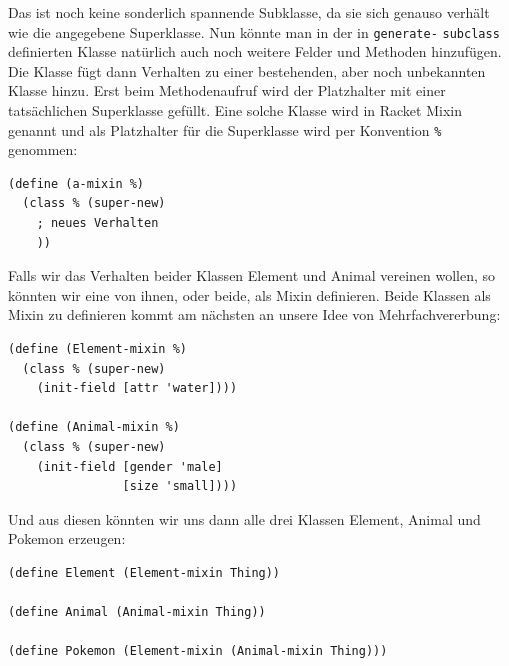 Das ist noch keine sonderlich spannende Subklasse, da sie sich genauso verhält wie die angegebene Superklasse.
% 
% 
% 
% 
% 
Nun könnte man in der in \texttt{generate-} \texttt{subclass} definierten Klasse natürlich auch noch weitere Felder und Methoden hinzufügen. Die Klasse fügt dann Verhalten zu einer bestehenden, aber noch unbekannten Klasse hinzu. Erst beim Methodenaufruf wird der Platzhalter mit einer tatsächlichen Superklasse gefüllt. Eine solche Klasse wird in Racket Mixin genannt und als Platzhalter für die Superklasse wird per Konvention \texttt{\%} genommen:

\begin{lstlisting}
(define (a-mixin %)
  (class % (super-new)
    ; neues Verhalten
    ))
\end{lstlisting}

Falls wir das Verhalten beider Klassen Element und Animal vereinen wollen, so könnten wir eine von ihnen, oder beide, als Mixin definieren. Beide Klassen als Mixin zu definieren kommt am nächsten an unsere Idee von Mehrfachvererbung:

\begin{lstlisting}
(define (Element-mixin %)
  (class % (super-new)
    (init-field [attr 'water])))

(define (Animal-mixin %)
  (class % (super-new)
    (init-field [gender 'male]
                [size 'small])))
\end{lstlisting}

Und aus diesen könnten wir uns dann alle drei Klassen Element, Animal und Pokemon erzeugen:
\begin{lstlisting}
(define Element (Element-mixin Thing))

(define Animal (Animal-mixin Thing))
 
(define Pokemon (Element-mixin (Animal-mixin Thing)))
\end{lstlisting}

